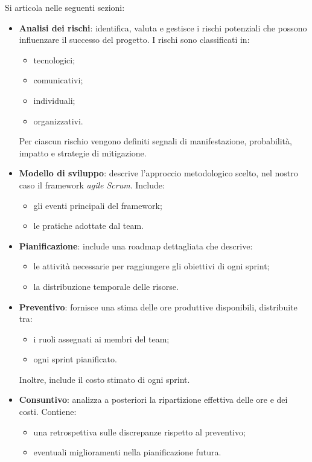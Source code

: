 Si articola nelle seguenti sezioni:
\begin{itemize}
    \item \textbf{Analisi dei rischi}: identifica, valuta e gestisce i rischi potenziali che possono influenzare il successo del progetto. I rischi sono classificati in:
    \begin{itemize}
        \item tecnologici;
        \item comunicativi;
        \item individuali;
        \item organizzativi.
    \end{itemize}
    Per ciascun rischio vengono definiti segnali di manifestazione, probabilità, impatto e strategie di mitigazione.

    \item \textbf{Modello di sviluppo}: descrive l’approccio metodologico scelto, nel nostro caso il framework \textit{agile Scrum}. Include:
    \begin{itemize}
        \item gli eventi principali del framework;
        \item le pratiche adottate dal team.
    \end{itemize}

    \item \textbf{Pianificazione}: include una roadmap dettagliata che descrive:
    \begin{itemize}
        \item le attività necessarie per raggiungere gli obiettivi di ogni sprint;
        \item la distribuzione temporale delle risorse.
    \end{itemize}

    \item \textbf{Preventivo}: fornisce una stima delle ore produttive disponibili, distribuite tra:
    \begin{itemize}
        \item i ruoli assegnati ai membri del team;
        \item ogni sprint pianificato.
    \end{itemize}
    Inoltre, include il costo stimato di ogni sprint.

    \item \textbf{Consuntivo}: analizza a posteriori la ripartizione effettiva delle ore e dei costi. Contiene:
    \begin{itemize}
        \item una retrospettiva sulle discrepanze rispetto al preventivo;
        \item eventuali miglioramenti nella pianificazione futura.
    \end{itemize}
\end{itemize}


